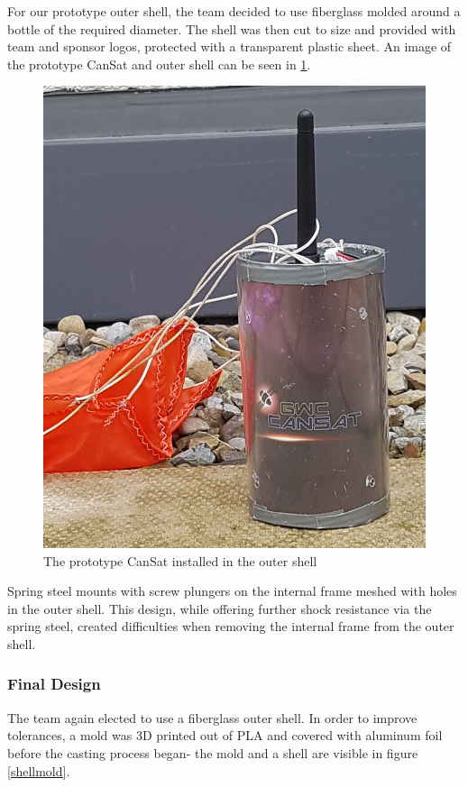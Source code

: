 \documentclass[]{report}
\begin{document}
For our prototype outer shell, the team decided to use fiberglass molded around a bottle of the required diameter. The shell was then cut to size and provided with team and sponsor logos, protected with a transparent plastic sheet. An image of the prototype CanSat and outer shell can be seen in \ref{cshell}. 

\begin{figure}[h]
	\hfill\includegraphics[scale=0.1]{cansat-shell.jpg}\hspace*{\fill}
	\caption{The prototype CanSat installed in the outer shell}
	\label{cshell}
\end{figure}


Spring steel mounts with screw plungers on the internal frame meshed with holes in the outer shell. This design, while offering further shock resistance via the spring steel, created difficulties when removing the internal frame from the outer shell.
\subsubsection{Final Design}
The team again elected to use a fiberglass outer shell. In order to improve tolerances, a mold was 3D printed out of PLA and covered with aluminum foil before the casting process began- the mold and a shell are visible in figure \ref{shellmold}.
\end{document}

